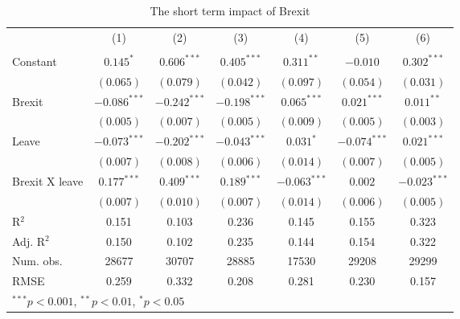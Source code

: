 \documentclass{article}
\begin{document}
\begin{table}
\begin{center}
{\begin{tabular}{l c c c c c c}
\\[0pt]
 & (1) & (2) & (3) & (4) & (5) & (6) \\[3pt]
\cmidrule[1pt]{2-7}
\\[-12pt] 
Constant                         & $0.145^{*}$    & $0.606^{***}$  & $0.405^{***}$  & $0.311^{**}$   & $-0.010$       & $0.302^{***}$  \\
                                 & $(0.065)$      & $(0.079)$      & $(0.042)$      & $(0.097)$      & $(0.054)$      & $(0.031)$      \\
Brexit                           & $-0.086^{***}$ & $-0.242^{***}$ & $-0.198^{***}$ & $0.065^{***}$  & $0.021^{***}$  & $0.011^{**}$   \\
                                 & $(0.005)$      & $(0.007)$      & $(0.005)$      & $(0.009)$      & $(0.005)$      & $(0.003)$      \\
Leave                            & $-0.073^{***}$ & $-0.202^{***}$ & $-0.043^{***}$ & $0.031^{*}$    & $-0.074^{***}$ & $0.021^{***}$  \\
                                 & $(0.007)$      & $(0.008)$      & $(0.006)$      & $(0.014)$      & $(0.007)$      & $(0.005)$      \\
                                 Brexit X leave                   & $0.177^{***}$  & $0.409^{***}$  & $0.189^{***}$  & $-0.063^{***}$ & $0.002$        & $-0.023^{***}$ \\
                                 & $(0.007)$      & $(0.010)$      & $(0.007)$      & $(0.014)$      & $(0.006)$      & $(0.005)$      \\
\hline
R$^2$                            & 0.151          & 0.103          & 0.236          & 0.145          & 0.155          & 0.323          \\
Adj. R$^2$                       & 0.150          & 0.102          & 0.235          & 0.144          & 0.154          & 0.322          \\
Num. obs.                        & 28677          & 30707          & 28885          & 17530          & 29208          & 29299          \\
RMSE                             & 0.259          & 0.332          & 0.208          & 0.281          & 0.230          & 0.157          \\
\hline
\multicolumn{7}{l}{\scriptsize{$^{***}p<0.001$, $^{**}p<0.01$, $^*p<0.05$}}
\end{tabular}
}
\caption{The short term impact of Brexit}
\label{table:coefficients}
\end{center}
\end{table}
                                 
\end{document}
